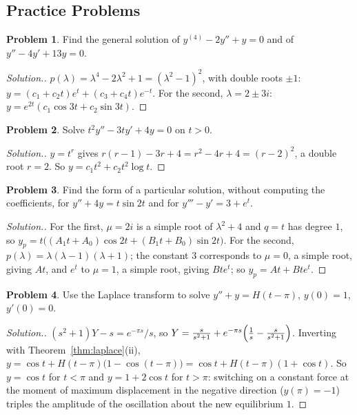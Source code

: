 \documentclass[11pt,a4paper]{article}
\numberwithin{equation}{section}
\theoremstyle{definition}
\newtheorem{problemx}{Problem}[subsection]
\newenvironment{problem}{\begin{problemx}}{\end{problemx}}
\newenvironment{solution}
  {\renewcommand{\qedsymbol}{}\begin{proof}[\textit{Solution}.]}
  {\end{proof}}
\begin{document}
\subsection{Practice Problems}

\begin{problem}
Find the general solution of $y^{(4)} - 2y'' + y = 0$ and of $y'' - 4y' + 13y = 0$.
\end{problem}

\begin{solution}
$p(\lambda) = \lambda^4 - 2\lambda^2 + 1 = (\lambda^2 - 1)^2$, with double roots $\pm1$: $y = (c_1 + c_2t)e^t + (c_3 + c_4t)e^{-t}$. For the second, $\lambda = 2 \pm 3i$: $y = e^{2t}(c_1\cos3t + c_2\sin3t)$.
\end{solution}

\begin{problem}
Solve $t^2y'' - 3ty' + 4y = 0$ on $t > 0$.
\end{problem}

\begin{solution}
$y = t^r$ gives $r(r - 1) - 3r + 4 = r^2 - 4r + 4 = (r - 2)^2$, a double root $r = 2$. So $y = c_1t^2 + c_2t^2\log t$.
\end{solution}

\begin{problem}
Find the form of a particular solution, without computing the coefficients, for $y'' + 4y = t\sin2t$ and for $y''' - y' = 3 + e^t$.
\end{problem}

\begin{solution}
For the first, $\mu = 2i$ is a simple root of $\lambda^2 + 4$ and $q = t$ has degree $1$, so $y_p = t\bigl((A_1t + A_0)\cos2t + (B_1t + B_0)\sin2t\bigr)$. For the second, $p(\lambda) = \lambda(\lambda - 1)(\lambda + 1)$; the constant $3$
corresponds to $\mu = 0$, a simple root, giving $At$, and $e^t$ to $\mu = 1$, a simple root, giving $Bte^t$; so $y_p = At + Bte^t$.
\end{solution}

\begin{problem}
Use the Laplace transform to solve $y'' + y = H(t - \pi)$, $y(0) = 1$, $y'(0) = 0$.
\end{problem}

\begin{solution}
$(s^2 + 1)Y - s = e^{-\pi s}/s$, so $Y = \frac{s}{s^2 + 1} + e^{-\pi s}\Bigl(\frac1s - \frac{s}{s^2 + 1}\Bigr)$. Inverting with Theorem~\ref{thm:laplace}(ii), $y = \cos t + H(t - \pi)\bigl(1 - \cos(t - \pi)\bigr) = \cos t + H(t - \pi)(1 + \cos t)$. So
$y = \cos t$ for $t < \pi$ and $y = 1 + 2\cos t$ for $t > \pi$: switching on a constant force at the moment of maximum displacement in the negative direction ($y(\pi) = -1$) triples the amplitude of
the oscillation about the new equilibrium $1$.
\end{solution}
\end{document}
